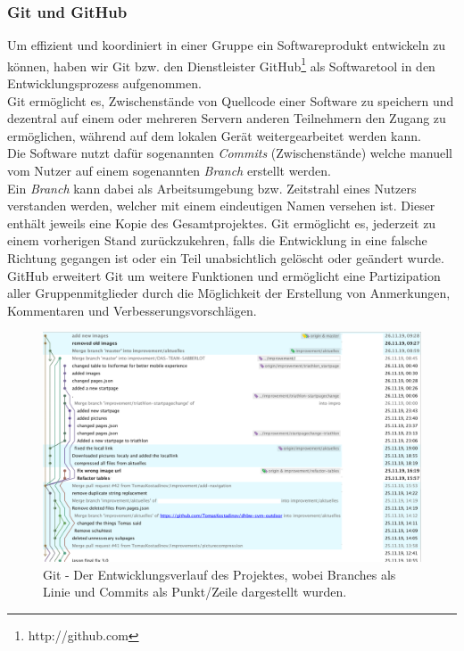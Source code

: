 \documentclass[12pt,a4paper]{article}
\begin{document}
\subsubsection{Git und GitHub}
Um effizient und koordiniert in einer Gruppe ein Softwareprodukt entwickeln zu können, haben wir Git bzw. den Dienstleister GitHub\footnote{\label{foot:2} http://github.com} als Softwaretool in den Entwicklungsprozess aufgenommen.\\
Git ermöglicht es, Zwischenstände von Quellcode einer Software zu speichern und dezentral auf einem oder mehreren Servern anderen Teilnehmern den Zugang zu ermöglichen, während auf dem lokalen Gerät weitergearbeitet werden kann.\\
Die Software nutzt dafür sogenannten \textit{Commits} (Zwischenstände) welche manuell vom Nutzer auf einem sogenannten \textit{Branch} erstellt werden. \\
Ein \textit{Branch} kann dabei als Arbeitsumgebung bzw. Zeitstrahl eines Nutzers verstanden werden, welcher mit einem eindeutigen Namen versehen ist. Dieser enthält jeweils eine Kopie des Gesamtprojektes.
Git ermöglicht es, jederzeit zu einem vorherigen Stand zurückzukehren, falls die Entwicklung in eine falsche Richtung gegangen ist oder ein Teil unabsichtlich gelöscht oder geändert wurde.\\
GitHub erweitert Git um weitere Funktionen und ermöglicht eine Partizipation aller Gruppenmitglieder durch die Möglichkeit der Erstellung von Anmerkungen, Kommentaren und Verbesserungsvorschlägen. 
\begin{figure}[!htbp]
	\includegraphics[scale=0.4]{git.png}
	\caption{Git - Der Entwicklungsverlauf des Projektes, wobei Branches als Linie und Commits als Punkt/Zeile dargestellt wurden.}
	\label{img:git}
\end{figure}
\end{document}
